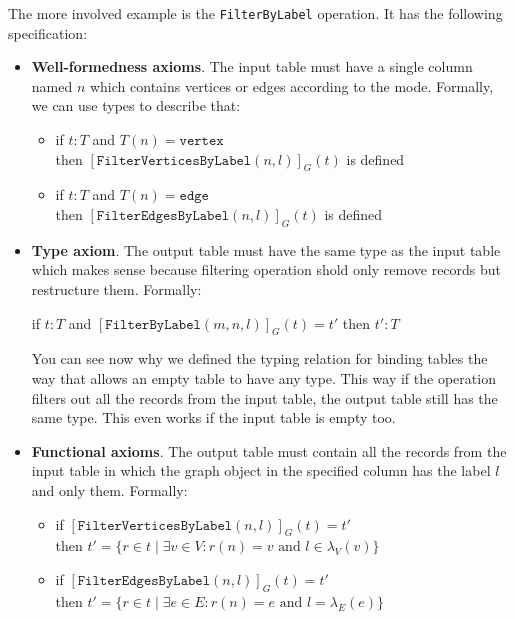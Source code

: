 \documentclass[14pt]{constructor-thesis}
\theoremstyle{definition}
\begin{document}
The more involved example is the \texttt{FilterByLabel} operation. It has the following specification:
\begin{itemize}
  \item \textbf{Well-formedness axioms}. The input table must have a single column named $n$ which contains vertices or edges according to the mode. Formally, we can use types to describe that:
  \begin{itemize}
    \item if $t : T$ and $T(n) = \texttt{vertex}$ \\
    then $[\texttt{FilterVerticesByLabel}(n, l)]_G(t)$ is defined 
    \item if $t : T$ and $T(n) = \texttt{edge}$ \\
    then $[\texttt{FilterEdgesByLabel}(n, l)]_G(t)$ is defined 
  \end{itemize}

  \item \textbf{Type axiom}. The output table must have the same type as the input table which makes sense because filtering operation shold only remove records but restructure them. Formally:
  \begin{center}
    if $t : T$ and $[\texttt{FilterByLabel}(m, n, l)]_G(t) = t'$
    then $t' : T$
  \end{center}

  You can see now why we defined the typing relation for binding tables the way that allows an empty table to have any type. This way if the operation filters out all the records from the input table, the output table still has the same type. This even works if the input table is empty too.

  \item \textbf{Functional axioms}. The output table must contain all the records from the input table in which the graph object in the specified column has the label $l$ and only them. Formally:
  \begin{itemize}
    \item if $[\texttt{FilterVerticesByLabel}(n, l)]_G(t) = t'$ \\
    then $t' = \{ r \in t \mid \exists v \in V : r(n) = v \text{ and } l \in \lambda_V(v) \}$
    \item if $[\texttt{FilterEdgesByLabel}(n, l)]_G(t) = t'$ \\
    then $t' = \{ r \in t \mid \exists e \in E : r(n) = e \text{ and } l = \lambda_E(e) \}$
  \end{itemize}
\end{itemize}
\end{document}
